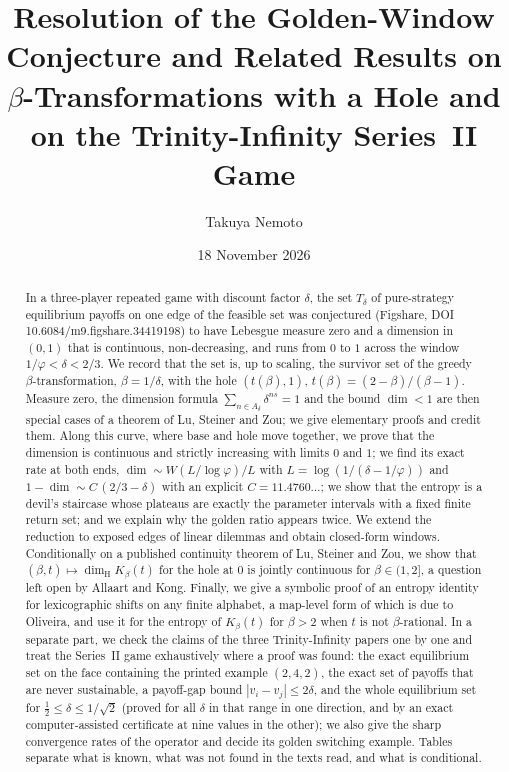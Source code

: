 \documentclass[11pt]{amsart}
\title[Resolution of the golden-window conjecture]{Resolution of the Golden-Window Conjecture and Related Results on $\beta$-Transformations with a Hole and on the Trinity-Infinity Series~II Game}
\author{Takuya Nemoto}
\date{18 November 2026}
\theoremstyle{remark}
\newcommand{\dimH}{\dim_{\mathrm H}}
\begin{document}
\begin{abstract}
In a three-player repeated game with discount factor $\delta$, the set $T_\delta$ of pure-strategy equilibrium payoffs on one edge of the feasible set was conjectured (Figshare, DOI 10.6084/m9.figshare.34419198) to have Lebesgue measure zero and a dimension in $(0,1)$ that is continuous, non-decreasing, and runs from $0$ to $1$ across the window $1/\varphi<\delta<2/3$. We record that the set is, up to scaling, the survivor set of the greedy $\beta$-transformation, $\beta=1/\delta$, with the hole $(t(\beta),1)$, $t(\beta)=(2-\beta)/(\beta-1)$. Measure zero, the dimension formula $\sum_{n\in A_\delta}\delta^{ns}=1$ and the bound $\dim<1$ are then special cases of a theorem of Lu, Steiner and Zou; we give elementary proofs and credit them. Along this curve, where base and hole move together, we prove that the dimension is continuous and strictly increasing with limits $0$ and $1$; we find its exact rate at both ends, $\dim\sim W(L/\log\varphi)/L$ with $L=\log(1/(\delta-1/\varphi))$ and $1-\dim\sim C\,(2/3-\delta)$ with an explicit $C=11.4760\ldots$; we show that the entropy is a devil's staircase whose plateaus are exactly the parameter intervals with a fixed finite return set; and we explain why the golden ratio appears twice. We extend the reduction to exposed edges of linear dilemmas and obtain closed-form windows. Conditionally on a published continuity theorem of Lu, Steiner and Zou, we show that $(\beta,t)\mapsto\dimH K_\beta(t)$ for the hole at $0$ is jointly continuous for $\beta\in(1,2]$, a question left open by Allaart and Kong. Finally, we give a symbolic proof of an entropy identity for lexicographic shifts on any finite alphabet, a map-level form of which is due to Oliveira, and use it for the entropy of $K_\beta(t)$ for $\beta>2$ when $t$ is not $\beta$-rational. In a separate part, we check the claims of the three Trinity-Infinity papers one by one and treat the Series~II game exhaustively where a proof was found: the exact equilibrium set on the face containing the printed example $(2,4,2)$, the exact set of payoffs that are never sustainable, a payoff-gap bound $|v_i-v_j|\le2\delta$, and the whole equilibrium set for $\frac12\le\delta\le1/\sqrt2$ (proved for all $\delta$ in that range in one direction, and by an exact computer-assisted certificate at nine values in the other); we also give the sharp convergence rates of the operator and decide its golden switching example. Tables separate what is known, what was not found in the texts read, and what is conditional.
\end{abstract}
\end{document}
